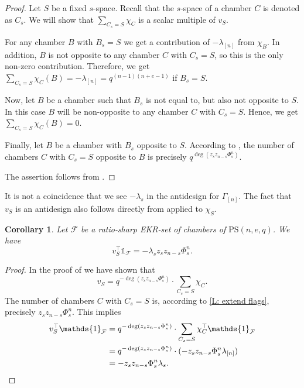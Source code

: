 \documentclass[11pt]{article}
\newtheorem{cor}[thm]{Corollary}
\newcommand{\allones}{\mathds{1}}
\newcommand{\EKR}{\mathcal{F}}
\newcommand{\PS}{\mathrm{PS}}
\begin{document}
\begin{proof}
    Let $S$ be a fixed $s$-space. Recall that the $s$-space of a chamber $C$ is denoted as $C_s$. We will show that $\sum\limits_{C_s=S}\chi_C$ is a scalar multiple of $v_S$. 
    
    For any chamber $B$ with $B_s=S$ we get a contribution of $-\lambda_{[n]}$ from $\chi_B$. In addition, $B$ is not opposite to any chamber $C$ with $C_s=S$, so this is the only non-zero contribution. Therefore, we get $\sum\limits_{C_s=S}\chi_C(B)=-\lambda_{[n]}=q^{(n-1)(n+e-1)}$ if $B_s=S$.

    Now, let $B$ be a chamber such that $B_s$ is not equal to, but also not opposite to $S$. In this case $B$ will be non-opposite to any chamber $C$ with $C_s=S$. Hence, we get $\sum\limits_{C_s=S}\chi_C(B)=0$.

    Finally, let $B$ be a chamber with $B_s$ opposite to $S$. According to , the number of chambers $C$ with $C_s=S$ opposite to $B$ is precisely $q^{\deg(z_sz_{n-s}\Phi_s^n)}$.

    The assertion follows from .
\end{proof}

It is not a coincidence that we see $-\lambda_s$ in the antidesign for $\Gamma_{[n]}$. The fact that $v_S$ is an antidesign also follows directly from  applied to $\chi_S$.


\begin{cor} \label{C: subspace_intersection}
Let $\EKR$ be a ratio-sharp EKR-set of chambers of $\PS(n,e,q)$.
We have 
$$v_S^\top \allones_\EKR %
=-\lambda_s z_sz_{n-s} \Phi_s^n .$$
\end{cor}
\begin{proof}
    In the proof of  we have shown that 
    $$v_S=q^{-\deg(z_sz_{n-s}\Phi_s^n)}\cdot\sum\limits_{C_s=S}\chi_C.$$
    The number of chambers $C$ with $C_s=S$ is, according to \ref{L: extend flags}, precisely $z_sz_{n-s}\Phi_s^n$. This implies 
    \begin{align*}
    \begin{split}
        v_S^\top \allones_\EKR&= q^{-\deg(z_sz_{n-s}\Phi_s^n)} \cdot \sum\limits_{C_s=S}\chi_C^\top \allones_\EKR\\
        &= q^{-\deg(z_sz_{n-s}\Phi_s^n)} \cdot (-z_sz_{n-s}\Phi_s^n\lambda_{[n]})\\
        &= -z_sz_{n-s}\Phi_s^n\lambda_{s}.
        \qedhere
    \end{split}
    \end{align*}
\end{proof}
\end{document}
